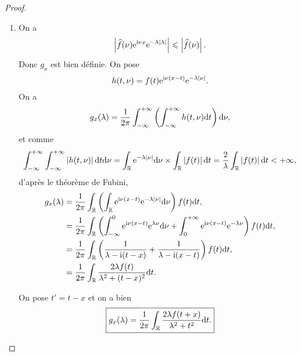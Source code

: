 \documentclass[12pt]{article}
\begin{document}
\begin{proof}
    \phantom{}
    \begin{enumerate}
        \item On a 
        \begin{equation*}
            \left\lvert\widehat{f}(\nu)\mathrm{e}^{\mathrm{i}\nu x}\mathrm{e}^{-\lambda\left\lvert\lambda\right\rvert}\right\rvert\leqslant\left\lvert \widehat{f}(\nu)\right\rvert.
        \end{equation*}
        Donc $g_x$ est bien définie. On pose 
        \begin{equation*}
            h(t,\nu)=f(t)\mathrm{e}^{\mathrm{i}\nu(x-t)}\mathrm{e}^{-\lambda\left\lvert\nu\right\rvert}.
        \end{equation*}
        On a 
        \begin{equation*}
            g_x(\lambda)=\frac{1}{2\pi}\int_{-\infty}^{+\infty}\left(\int_{-\infty}^{+\infty}h(t,\nu)\mathrm{d} t\right)\mathrm{d}\nu,
        \end{equation*}
        et comme 
        \begin{equation*}
            \int_{-\infty}^{+\infty}\int_{-\infty}^{+\infty}\left\lvert h(t,\nu)\right\rvert\mathrm{d} t\mathrm{d}\nu=\int_{\mathbb{R}}\mathrm{e}^{-\lambda\left\lvert\nu\right\rvert}\mathrm{d}\nu\times\int_{\mathbb{R}}\left\lvert f(t)\right\rvert\mathrm{d} t=\frac{2}{\lambda}\int_{\mathbb{R}}\left\lvert f(t)\right\rvert\mathrm{d} t<+\infty,
        \end{equation*}
        d'après le théorème de Fubini,
        \begin{align*}
            g_x(\lambda)
            &=\frac{1}{2\pi}\int_{\mathbb{R}}\left(\int_{\mathbb{R}}\mathrm{e}^{\mathrm{i}\nu(x-t)}\mathrm{e}^{-\lambda\left\lvert\nu\right\rvert}\mathrm{d} \nu\right)f(t)\mathrm{d} t,\\
            &=\frac{1}{2\pi}\int_{\mathbb{R}}\left(\int_{-\infty}^{0}\mathrm{e}^{\mathrm{i}\nu(x-t)}\mathrm{e}^{\lambda\nu}\mathrm{d} \nu+\int_{0}^{+\infty}\mathrm{e}^{\mathrm{i}\nu(x-t)}\mathrm{e}^{-\lambda\nu}\right)f(t)\mathrm{d} t,\\
            &=\frac{1}{2\pi}\int_{\mathbb{R}}\left(\frac{1}{\lambda-\mathrm{i}(t-x)}+\frac{1}{\lambda-\mathrm{i}(x-t)}\right)f(t)\mathrm{d} t,\\
            &=\frac{1}{2\pi}\int_{\mathbb{R}}\frac{2\lambda f(t)}{\lambda^{2}+(t-x)^{2}}\mathrm{d} t.
        \end{align*}

        On pose $t'=t-x$ et on a bien 
        \begin{equation*}
            \boxed{
                g_x(\lambda)=\frac{1}{2\pi}\int_{\mathbb{R}}\frac{2\lambda f(t+x)}{\lambda^{2}+t^{2}}\mathrm{d} t.
            }
        \end{equation*}


\end{enumerate}
\end{proof}
\end{document}
